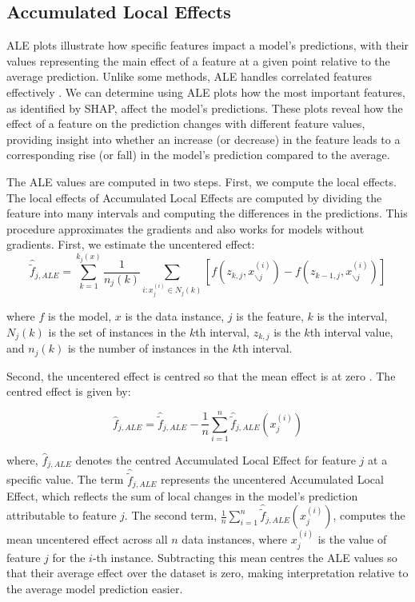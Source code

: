 \subsection{Accumulated Local Effects}
ALE plots illustrate how specific features impact a model's predictions, with their values representing the main effect of a feature at a given point relative to the average prediction. Unlike some methods, ALE handles correlated features effectively \cite{apley_visualizing_2019}. We can determine using ALE plots how the most important features, as identified by SHAP, affect the model's predictions. These plots reveal how the effect of a feature on the prediction changes with different feature values, providing insight into whether an increase (or decrease) in the feature leads to a corresponding rise (or fall) in the model's prediction compared to the average.

The ALE values are computed in two steps. First, we compute the local effects. The local effects of Accumulated Local Effects are computed by dividing the feature into many intervals and computing the differences in the predictions. This procedure approximates the gradients and also works for models without gradients. First, we estimate the uncentered effect:
\begin{equation}
 \hat{\tilde{f}}_{j, ALE} = \sum_{k=1}^{k_j(x)} \frac{1}{n_j(k)} \sum_{i:x_j^{(i)} \in N_j(k)} [f(z_{k,j}, x_{\backslash j}^{(i)}) - f(z_{k-1,j}, x_{\backslash j}^{(i)})] 
\end{equation}

where $f$ is the model, $x$ is the data instance, $j$ is the feature, $k$ is the interval, $N_j(k)$ is the set of instances in the $k$th interval, $z_{k,j}$ is the $k$th interval value, and $n_j(k)$ is the number of instances in the $k$th interval.

Second, the uncentered effect is centred so that the mean effect is at zero \cite{molnar_interpretable_nodate}. The centred effect is given by:

\begin{equation}
 \hat{f}_{j, ALE} = \hat{\tilde{f}}_{j, ALE} - \frac{1}{n} \sum_{i=1}^{n} \hat{\tilde{f}}_{j, ALE} (x_j^{(i)})
\end{equation}

where, $\hat{f}_{j, ALE}$ denotes the centred Accumulated Local Effect for feature $j$ at a specific value. The term $\hat{\tilde{f}}_{j, ALE}$ represents the uncentered Accumulated Local Effect, which reflects the sum of local changes in the model's prediction attributable to feature $j$. The second term, $\frac{1}{n} \sum_{i=1}^{n} \hat{\tilde{f}}_{j, ALE} (x_j^{(i)})$, computes the mean uncentered effect across all $n$ data instances, where $x_j^{(i)}$ is the value of feature $j$ for the $i$-th instance. Subtracting this mean centres the ALE values so that their average effect over the dataset is zero, making interpretation relative to the average model prediction easier.

